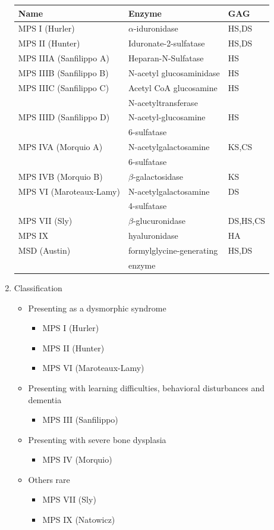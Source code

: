 \documentclass{scrartcl}
\begin{document}
\begin{enumerate}
\small
\begin{center}
\begin{tabular}{lll}
Name & Enzyme & GAG\\
\hline
MPS I (Hurler) & \(\alpha\)-iduronidase & HS,DS\\
MPS II (Hunter) & Iduronate-2-sulfatase & HS,DS\\
\hline
MPS IIIA (Sanfilippo A) & Heparan-N-Sulfatase & HS\\
MPS IIIB (Sanfilippo B) & N-acetyl glucosaminidase & HS\\
MPS IIIC (Sanfilippo C) & Acetyl CoA glucosamine & HS\\
 & N-acetyltransferase & \\
MPS IIID (Sanfilippo D) & N-acetyl-glucosamine & HS\\
 & 6-sulfatase & \\
\hline
MPS IVA (Morquio A) & N-acetylgalactosamine & KS,CS\\
 & 6-sulfatase & \\
MPS IVB (Morquio B) & \(\beta\)-galactosidase & KS\\
\hline
MPS VI (Maroteaux-Lamy) & N-acetylgalactosamine & DS\\
 & 4-sulfatase & \\
MPS VII (Sly) & \(\beta\)-glucuronidase & DS,HS,CS\\
MPS IX & hyaluronidase & HA\\
MSD (Austin) & formylglycine-generating & HS,DS\\
 & enzyme & \\
\end{tabular}
\end{center}



\item Classification
\label{sec:orgbf1d65d}
\begin{itemize}
\item Presenting as a dysmorphic syndrome
\begin{itemize}
\item MPS I (Hurler)
\item MPS II (Hunter)
\item MPS VI (Maroteaux-Lamy)
\end{itemize}
\item Presenting with learning difficulties, behavioral disturbances and dementia
\begin{itemize}
\item MPS III (Sanfilippo)
\end{itemize}
\item Presenting with severe bone dysplasia
\begin{itemize}
\item MPS IV (Morquio)
\end{itemize}
\item Others rare
\begin{itemize}
\item MPS VII (Sly)
\item MPS IX (Natowicz)
\end{itemize}
\end{itemize}




\end{enumerate}
\end{document}
